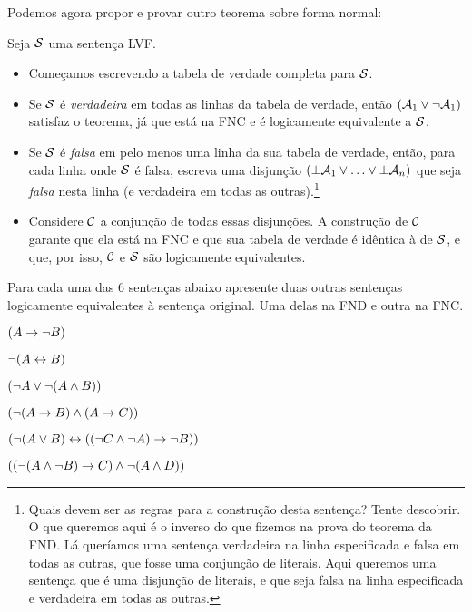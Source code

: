 Podemos agora propor e provar outro teorema sobre forma normal:

Seja $\mathcal{S}$ uma sentença LVF.
	\begin{itemize}
       	\item Começamos escrevendo a tabela de verdade completa para $\mathcal{S}$.
       	\item Se $\mathcal{S}$ é \emph{verdadeira} em todas as linhas da tabela de verdade, então $(\mathcal{A}_1 \vee \neg \mathcal{A}_1)$ satisfaz o teorema, já que está na FNC e é logicamente equivalente a $\mathcal{S}$.
       	\item Se $\mathcal{S}$ é \emph{falsa} em pelo menos uma linha da sua tabela de verdade, então, para cada linha onde $\mathcal{S}$ é falsa, escreva uma disjunção $(\pm\mathcal{A}_1 \vee \ldots \vee \pm\mathcal{A}_n)$ que seja \emph{falsa} nesta linha (e verdadeira em todas as outras).\footnote{
       	Quais devem ser as regras para a construção desta sentença? Tente descobrir. O que queremos aqui é o inverso do que fizemos na prova do teorema da FND.
       	Lá queríamos uma sentença verdadeira na linha especificada e falsa em todas as outras, que fosse uma conjunção de literais.
       	Aqui queremos uma sentença que é uma disjunção de literais, e que seja falsa na linha especificada e verdadeira em todas as outras.}
       	\item Considere $\mathcal{C}$ a conjunção de todas essas disjunções.
       	A construção de $\mathcal{C}$ garante que ela está na FNC e que sua tabela de verdade é idêntica à de $\mathcal{S}$, e que, por isso, $\mathcal{C}$ e $\mathcal{S}$ são logicamente equivalentes.
	\end{itemize}
       
 
\practiceproblems
\problempart
\label{pr.DNF}
Para cada uma das 6 sentenças abaixo apresente duas outras sentenças logicamente equivalentes à sentença original.
Uma delas na FND e outra na FNC.
	\begin{earg}
		\item $(A \rightarrow \neg B)$
		\item $\neg (A \leftrightarrow B)$
		\item $(\neg A \vee \neg (A \wedge B))$
		\item $(\neg (A \rightarrow B ) \wedge (A \rightarrow C))$
		\item $(\neg (A \vee B) \leftrightarrow ((\neg C \wedge \neg A) \rightarrow \neg B))$
		\item $((\neg (A \wedge \neg B) \rightarrow C) \wedge \neg (A \wedge D))$
	\end{earg}

